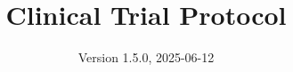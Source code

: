 \documentclass[
]{scrartcl}
\title{Clinical Trial Protocol}
\subtitle{ADVANCE TRAUMA\\
\strut \\
Effects of Advanced Trauma Life Support\textsuperscript{®} Training
Compared to Standard Care on Adult Trauma Patient Outcomes: A
Stepped-Wedge Cluster Randomised Trial}
\author{Version 1.5.0, 2025-06-12}
\date{}
\begin{document}


\begin{titlepage}


\newcommand{\titlepagepagealign}{
\ifthenelse{\equal{center}{right}}{\raggedleft}{}
\ifthenelse{\equal{center}{center}}{\centering}{}
\ifthenelse{\equal{center}{left}}{\raggedright}{}
}


\newcommand{\titleandsubtitle}{
{\fontsize{15}{18.0}\selectfont
{\uppercase{\nohyphens{Clinical Trial Protocol}}}\par
}%

\vspace{\betweentitlesubtitle}
{
\fontsize{20}{24.0}\selectfont
{\bfseries{\nohyphens{ADVANCE TRAUMA\\
\strut \\
Effects of Advanced Trauma Life Support\textsuperscript{®} Training
Compared to Standard Care on Adult Trauma Patient Outcomes: A
Stepped-Wedge Cluster Randomised Trial}}}\par
}}
\newcommand{\titlepagetitleblock}{
\rule{\textwidth}{0.4pt} %
\vspace{0.025\textheight} %

\titleandsubtitle

\vspace{0.025\textheight} 
\rule{0.3\textwidth}{0.4pt} %
}
\newcommand{\authorstyle}[1]{{\Large{#1}}}

\newcommand{\affiliationstyle}[1]{{\large{#1}}}

\newcommand{\titlepageauthorblock}{
{\authorstyle{\nohyphens{Version 1.5.0, 2025-06-12}\\}}
}

\newcommand{\titlepageaffiliationblock}{
\hangindent=1em
\hangafter=1
{\affiliationstyle{


\vspace{1\baselineskip} 
}}
}
\newcommand{\headerstyled}{%
{}
}
\newcommand{\footerstyled}{%
{\large{\textsc{}}}
}
\newcommand{\datestyled}{%
{}
}


\newcommand{\titlepageheaderblock}{\headerstyled}

\newcommand{\titlepagefooterblock}{
\footerstyled
}

\newcommand{\titlepagedateblock}{
\datestyled
}

\newcommand{\titleblock}{\newlength{\betweentitlesubtitle}
\setlength{\betweentitlesubtitle}{\baselineskip}
{

}}
\end{titlepage}
\end{document}

